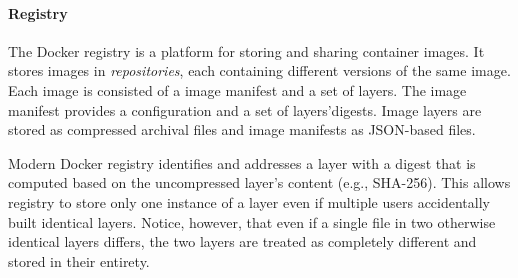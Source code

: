 

\paragraph{Registry}
%
The Docker registry is a platform for storing and sharing container images.
%
It stores images in \emph{repositories}, each containing different versions of
the same image. 
%
Each image is consisted of a image manifest and a set of layers.
%
The image manifest provides a configuration and a set of layers'digests.
%
Image layers are stored as compressed archival files and image
manifests as JSON-based files.
%
%
%
%

Modern Docker registry identifies and addresses a layer with a digest that is
computed based on the uncompressed layer's content (e.g., SHA-256).
%
%
This allows registry to store only one instance of a layer even if multiple
users accidentally built identical layers.
%
Notice, however, that even if a single file in two otherwise identical layers
differs, the two layers are treated as completely different and stored in their
entirety.

